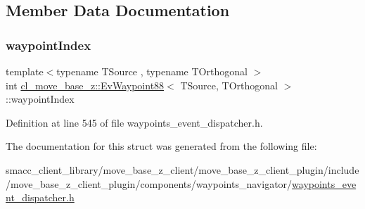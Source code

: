 \subsection{Member Data Documentation}
\mbox{\label{structcl__move__base__z_1_1EvWaypoint88_acd3e4a002a90e05e8f258f05b1ea1984}} 
\subsubsection{\texorpdfstring{waypoint\+Index}{waypointIndex}}
{\footnotesize\ttfamily template$<$typename T\+Source , typename T\+Orthogonal $>$ \\
int \hyperlink{structcl__move__base__z_1_1EvWaypoint88}{cl\+\_\+move\+\_\+base\+\_\+z\+::\+Ev\+Waypoint88}$<$ T\+Source, T\+Orthogonal $>$\+::waypoint\+Index}



Definition at line 545 of file waypoints\+\_\+event\+\_\+dispatcher.\+h.



The documentation for this struct was generated from the following file\+:\begin{DoxyCompactItemize}
\item 
smacc\+\_\+client\+\_\+library/move\+\_\+base\+\_\+z\+\_\+client/move\+\_\+base\+\_\+z\+\_\+client\+\_\+plugin/include/move\+\_\+base\+\_\+z\+\_\+client\+\_\+plugin/components/waypoints\+\_\+navigator/\hyperlink{waypoints__event__dispatcher_8h}{waypoints\+\_\+event\+\_\+dispatcher.\+h}\end{DoxyCompactItemize}
